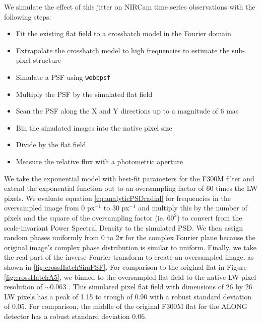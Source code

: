 \documentclass{aastex62}
\begin{document}
We simulate the effect of this jitter on NIRCam time series observations with the following steps:
\begin{itemize}
	\item Fit the existing flat field to a crosshatch model in the Fourier domain
	\item Extrapolate the crosshatch model to high frequencies to estimate the sub-pixel structure
	\item Simulate a PSF using \texttt{webbpsf} \citep{perrin2014webbpsf}
	\item Multiply the PSF by the simulated flat field
	\item Scan the PSF along the X and Y directions up to a magnitude of 6 mas
	\item Bin the simulated images into the native pixel size
	\item Divide by the flat field
	\item Measure the relative flux with a photometric aperture
\end{itemize}



We take the exponential model with best-fit parameters for the F300M filter and extend the exponential function out to an oversampling factor of 60 times the LW pixels.
We evaluate equation \ref{eq:analyticPSDradial} for frequencies in the oversampled image from 0 px$^{-1}$ to 30 px$^{-1}$ and multiply this by the number of pixels and the square of the oversampling factor (ie. $60^2$) to convert from the scale-invariant Power Spectral Density to the simulated PSD.
We then assign random phases uniformly from 0 to 2$\pi$ for the complex Fourier plane because the original image's complex phase distribution is similar to uniform.
Finally, we take the real part of the inverse Fourier transform to create an oversampled image, as shown in \ref{fig:crossHatchSimPSF}.
For comparison to the original flat in Figure \ref{fig:crossHatchA5}, we binned to the oversampled flat field to the native LW pixel resolution of $\sim$0.063 \arcsec.
This simulated pixel flat field with dimensions of 26 by 26 LW pixels has a peak of 1.15 to trough of 0.90 with a robust standard deviation of 0.05.
For comparison, the middle of the original F300M flat for the ALONG detector has a robust standard deviation 0.06.
\end{document}
